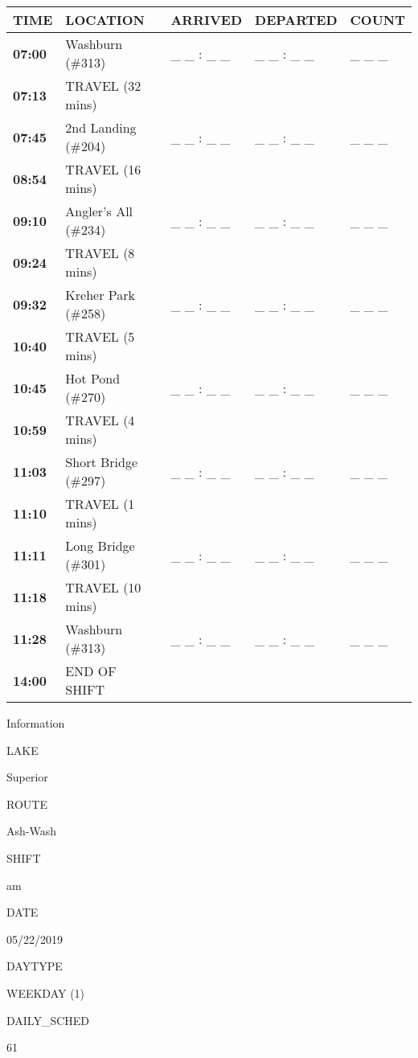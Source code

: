 \documentclass[]{article}
\begin{document}
\begin{tabular}{>{\bfseries}lllll}
\toprule
\textbf{TIME} & \textbf{LOCATION} & \textbf{ARRIVED} & \textbf{DEPARTED} & \textbf{COUNT}\\
\midrule
07:00 & Washburn (\#313) & \_ \_ : \_ \_ & \_ \_ : \_ \_ & \_ \_ \_\\
07:13 & TRAVEL (32 mins) &  &  & \\
07:45 & 2nd Landing (\#204) & \_ \_ : \_ \_ & \_ \_ : \_ \_ & \_ \_ \_\\
08:54 & TRAVEL (16 mins) &  &  & \\
09:10 & Angler's All (\#234) & \_ \_ : \_ \_ & \_ \_ : \_ \_ & \_ \_ \_\\
09:24 & TRAVEL (8 mins) &  &  & \\
09:32 & Kreher Park (\#258) & \_ \_ : \_ \_ & \_ \_ : \_ \_ & \_ \_ \_\\
10:40 & TRAVEL (5 mins) &  &  & \\
10:45 & Hot Pond (\#270) & \_ \_ : \_ \_ & \_ \_ : \_ \_ & \_ \_ \_\\
10:59 & TRAVEL (4 mins) &  &  & \\
11:03 & Short Bridge (\#297) & \_ \_ : \_ \_ & \_ \_ : \_ \_ & \_ \_ \_\\
11:10 & TRAVEL (1 mins) &  &  & \\
11:11 & Long Bridge (\#301) & \_ \_ : \_ \_ & \_ \_ : \_ \_ & \_ \_ \_\\
11:18 & TRAVEL (10 mins) &  &  & \\
11:28 & Washburn (\#313) & \_ \_ : \_ \_ & \_ \_ : \_ \_ & \_ \_ \_\\
14:00 & END OF SHIFT &  &  & \\
\bottomrule
\end{tabular}\newpage

Information

LAKE

Superior

ROUTE

Ash-Wash

SHIFT

am

DATE

05/22/2019

DAYTYPE

WEEKDAY (1)

DAILY\_SCHED

61

\vspace{24pt}
\end{document}
